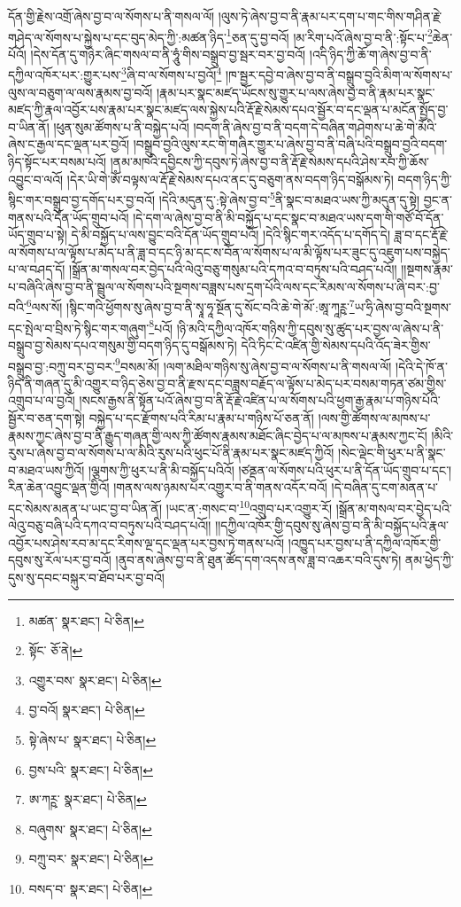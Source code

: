 དོན་གྱི་རྗེས་འགྲོ་ཞེས་བྱ་བ་ལ་སོགས་པ་ནི་གསལ་ལོ། །ལུས་ཏེ་ཞེས་བྱ་བ་ནི་རྣམ་པར་དག་པ་གང་གིས་གཤིན་རྗེ་གཤེད་ལ་སོགས་པ་སྐྱེས་པ་དང་བུད་མེད་ཀྱི་:མཚན་ཉིད་\footnote{མཚན་  སྣར་ཐང་།  པེ་ཅིན། }ཅན་དུ་བྱ་བའོ། །མ་རིག་པའོ་ཞེས་བྱ་བ་ནི་:སྟོང་པ་\footnote{སྟོང་  ཅོ་ནེ། }ཆེན་པོའོ། །དེས་དོན་དུ་གཉེར་ཞིང་གསལ་བ་ནི་ཧཱུཾ་གིས་བསྒྲུབ་བྱ་སྦར་བར་བྱ་བའོ། །འདི་ཉིད་ཀྱི་ཆོ་ག་ཞེས་བྱ་བ་ནི་དཀྱིལ་འཁོར་པར་:གྱུར་པས་\footnote{འགྱུར་བས་  སྣར་ཐང་།  པེ་ཅིན། }ཞི་བ་ལ་སོགས་པ་བྱའོ།\footnote{བྱ་བའོ།  སྣར་ཐང་།  པེ་ཅིན། } །ཁ་སྦྱར་དབྱེ་བ་ཞེས་བྱ་བ་ནི་བསྒྲུབ་བྱའི་མིག་ལ་སོགས་པ་ལུས་ལ་བཅུག་ལ་ལས་རྣམས་བྱ་བའོ། །རྣམ་པར་སྣང་མཛད་ཡོངས་སུ་གྱུར་པ་ལས་ཞེས་བྱ་བ་ནི་རྣམ་པར་སྣང་མཛད་ཀྱི་རྣལ་འབྱོར་པས་རྣམ་པར་སྣང་མཛད་ལས་སྐྱེས་པའི་རྡོ་རྗེ་སེམས་དཔའ་སྦྱོར་བ་དང་ལྡན་པ་མངོན་སྤྱོད་བྱ་བ་ཡིན་ནོ། །ཕུན་སུམ་ཚོགས་པ་ནི་བསྐྱེད་པའོ། །བདག་ནི་ཞེས་བྱ་བ་ནི་བདག་དེ་བཞིན་གཤེགས་པ་ཆེ་གེ་མོའི་ཞེས་ང་རྒྱལ་དང་ལྡན་པར་བྱའོ། །བསྒྲུབ་བྱའི་ལུས་རང་གི་གཞིར་གྱུར་པ་ཞེས་བྱ་བ་ནི་བཞི་པའི་བསྒྲུབ་བྱའི་བདག་ཉིད་སྟོང་པར་བསམ་པའོ། །ནམ་མཁའི་དབྱིངས་ཀྱི་དབུས་ཏེ་ཞེས་བྱ་བ་ནི་རྡོ་རྗེ་སེམས་དཔའི་ཤེས་རབ་ཀྱི་ཆོས་འབྱུང་བ་ལའོ། །དེར་ཡི་གེ་ཨོཾ་བལྟས་ལ་རྡོ་རྗེ་སེམས་དཔའ་ནང་དུ་བཅུག་ནས་བདག་ཉིད་བསྒོམས་ཏེ། བདག་ཉིད་ཀྱི་སྙིང་གར་བསྒྲུབ་བྱ་དགོད་པར་བྱ་བའོ། །དེའི་མདུན་དུ་:སྟེ་ཞེས་བྱ་བ་\footnote{སྟེ་ཞེས་པ་  སྣར་ཐང་།  པེ་ཅིན། }ནི་སྣང་བ་མཐའ་ཡས་ཀྱི་མདུན་དུ་སྟེ། བྱང་ན་གནས་པའི་དོན་ཡོད་གྲུབ་པའོ། །དེ་དག་ལ་ཞེས་བྱ་བ་ནི་མི་བསྐྱོད་པ་དང་སྣང་བ་མཐའ་ཡས་དག་གི་གཙོ་བོ་དོན་ཡོད་གྲུབ་པ་སྟེ། དེ་མི་བསྐྱོད་པ་ལས་བྱུང་བའི་དོན་ཡོད་གྲུབ་པའོ། །དེའི་སྙིང་གར་འདོད་པ་དགོད་དེ། ཟླ་བ་དང་རྡོ་རྗེ་ལ་སོགས་པ་ལ་ལྟོས་པ་མེད་པ་ནི་ཟླ་བ་དང་ཉི་མ་དང་ས་བོན་ལ་སོགས་པ་ལ་མི་ལྟོས་པར་ཟུང་དུ་འཇུག་པས་བསྐྱེད་པ་ལ་བཤད་དོ། །སྒྲོན་མ་གསལ་བར་བྱེད་པའི་ལེའུ་བཅུ་གསུམ་པའི་དཀའ་བ་བཏུས་པའི་བཤད་པའོ།། །།སྔགས་རྣམ་པ་བཞིའི་ཞེས་བྱ་བ་ནི་སྦྲུལ་ལ་སོགས་པའི་སྔགས་བཟླས་པས་དྲག་པོའི་ལས་དང་རིམས་ལ་སོགས་པ་ཞི་བར་:བྱ་བའི་\footnote{བྱས་པའི་  སྣར་ཐང་།  པེ་ཅིན། }ལས་སོ། །སྙིང་གའི་ཕྱོགས་སུ་ཞེས་བྱ་བ་ནི་སྭཱ་ཧཱ་སྔོན་དུ་སོང་བའི་ཆེ་གེ་མོ་:ཨཱ་ཀཱཪྵ་\footnote{ཨ་ཀཪྵ་  སྣར་ཐང་།  པེ་ཅིན། }ཡ་ཧྲི་ཞེས་བྱ་བའི་སྔགས་དང་སྤེལ་བ་བྲིས་ཏེ་སྙིང་གར་གཞུག་\footnote{བཞུགས་  སྣར་ཐང་།  པེ་ཅིན། }པའོ། །ཉི་མའི་དཀྱིལ་འཁོར་གཉིས་ཀྱི་དབུས་སུ་ཚུད་པར་བྱས་ལ་ཞེས་པ་ནི་བསྒྲུབ་བྱ་སེམས་དཔའ་གསུམ་གྱི་བདག་ཉིད་དུ་བསྒོམས་ཏེ། དེའི་ཏིང་ངེ་འཛིན་གྱི་སེམས་དཔའི་འོད་ཟེར་གྱིས་བསྒྲུབ་བྱ་:བཀྲུ་བར་བྱ་བར་\footnote{བཀྲུ་བར་  སྣར་ཐང་།  པེ་ཅིན། }བསམ་མོ། །ལག་མཐིལ་གཉིས་སུ་ཞེས་བྱ་བ་ལ་སོགས་པ་ནི་གསལ་ལོ། །དེའི་དེ་ཁོ་ན་ཉིད་ནི་གཞན་དུ་མི་འགྱུར་བ་ཉིད་ཅེས་བྱ་བ་ནི་རྫས་དང་བཟླས་བརྗོད་ལ་ལྟོས་པ་མེད་པར་བསམ་གཏན་ཙམ་གྱིས་འགྲུབ་པ་ལ་བྱའོ། །སངས་རྒྱས་ནི་སྟོན་པའོ་ཞེས་བྱ་བ་ནི་རྡོ་རྗེ་འཛིན་པ་ལ་སོགས་པའི་ཕྱག་རྒྱ་རྣམ་པ་གཉིས་པོའི་སྦྱོར་བ་ཅན་དག་སྟེ། བསྐྱེད་པ་དང་རྫོགས་པའི་རིམ་པ་རྣམ་པ་གཉིས་པོ་ཅན་ནོ། །ལས་གྱི་ཚོགས་ལ་མཁས་པ་རྣམས་ཀྱང་ཞེས་བྱ་བ་ནི་རྒྱུད་གཞན་གྱི་ལས་ཀྱི་ཚོགས་རྣམས་མཐོང་ཞིང་བྱེད་པ་ལ་མཁས་པ་རྣམས་ཀྱང་ངོ། །མིའི་རུས་པ་ཞེས་བྱ་བ་ལ་སོགས་པ་ལ་མིའི་རུས་པའི་ཕུང་པོ་ནི་རྣམ་པར་སྣང་མཛད་ཀྱིའོ། །སེང་ལྡེང་གི་ཕུར་པ་ནི་སྣང་བ་མཐའ་ཡས་ཀྱིའོ། །ལྕགས་ཀྱི་ཕུར་པ་ནི་མི་བསྐྱོད་པའིའོ། །ཙནྡན་ལ་སོགས་པའི་ཕུར་པ་ནི་དོན་ཡོད་གྲུབ་པ་དང་། རིན་ཆེན་འབྱུང་ལྡན་གྱིའོ། །གནས་ལས་ཉམས་པར་འགྱུར་བ་ནི་གནས་འདོར་བའོ། །དེ་བཞིན་དུ་ངག་མནན་པ་དང་སེམས་མནན་པ་ཡང་བྱ་བ་ཡིན་ནོ། །ཡང་ན་:གསང་བ་\footnote{བསད་བ་  སྣར་ཐང་།  པེ་ཅིན། }འགྲུབ་པར་འགྱུར་རོ། །སྒྲོན་མ་གསལ་བར་བྱེད་པའི་ལེའུ་བཅུ་བཞི་པའི་དཀའ་བ་བཏུས་པའི་བཤད་པའོ།། །།དཀྱིལ་འཁོར་གྱི་དབུས་སུ་ཞེས་བྱ་བ་ནི་མི་བསྐྱོད་པའི་རྣལ་འབྱོར་པས་ཤེས་རབ་མ་དང་རིགས་ལྔ་དང་ལྡན་པར་བྱས་ཏེ་གནས་པའོ། །འཁྱུད་པར་བྱས་པ་ནི་དཀྱིལ་འཁོར་གྱི་དབུས་སུ་རོལ་པར་བྱ་བའོ། །ནུབ་ནས་ཞེས་བྱ་བ་ནི་ཐུན་ཚོད་དག་འདས་ནས་ཟླ་བ་འཆར་བའི་དུས་ཏེ། ནམ་ཕྱེད་ཀྱི་དུས་སུ་དབང་བསྐུར་བ་ཐོབ་པར་བྱ་བའོ། 